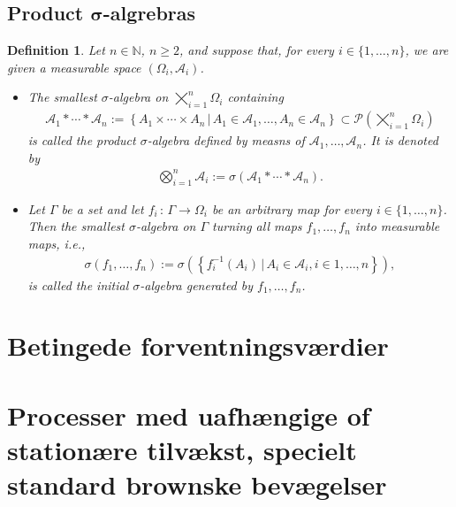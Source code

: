 \documentclass{article}
\newtheorem{definition}{Definition}[section]
\numberwithin{equation}{section}
\begin{document}
\subsection*{Product $\boldsymbol{\sigma}$-algrebras}
\begin{definition}
    Let $n\in\mathbb{N}$, $n \geq 2$, and suppose that, for every $i \in \{1,\ldots,n\}$, we are given a measurable space $(\Omega_i, \mathcal{A}_i)$.
    \begin{itemize}
        \item The smallest $\sigma$-algebra on $\bigtimes_{i=1}^n \Omega_i$ containing
        \begin{align*}
            \mathcal{A}_1 \ast \cdots \ast \mathcal{A}_n := 
            \left\{A_1 \times \cdots \times A_n \, | \, A_1 \in \mathcal{A}_1, \ldots, A_n \in \mathcal{A}_n\right\} %
            \subset \mathcal{P}\left(\bigtimes_{i=1}^n \Omega_i\right)
        \end{align*}
        is called the product $\sigma$-algebra defined by measns of $\mathcal{A}_1,\ldots,\mathcal{A}_n$.
        It is denoted by
        \begin{align*}
            \bigotimes_{i=1}^n \mathcal{A}_i := \sigma\left(\mathcal{A}_1 \ast \cdots \ast \mathcal{A}_n\right).
        \end{align*}
        \item Let $\Gamma$ be a set and let $f_i \, : \, \Gamma \rightarrow \Omega_i$ be an arbitrary map for every $i \in \{1, \ldots, n\}$.
        Then the smallest $\sigma$-algebra on $\Gamma$ turning all maps $f_1,\ldots,f_n$ into measurable maps, i.e.,
        \begin{align*}
            \sigma(f_1, \ldots, f_n) := \sigma\left(\left\{f_i^{-1}(A_i)\, | \, A_i \in \mathcal{A}_i, i \in {1,\ldots,n}\right\}\right),
        \end{align*}
        is called the initial $\sigma$-algebra generated by $f_1, \ldots,f_n$.
    \end{itemize}
\end{definition}

\newpage

\section{Betingede forventningsværdier}

\newpage

\section{Processer med uafhængige of stationære tilvækst, specielt standard brownske bevægelser}
\end{document}
